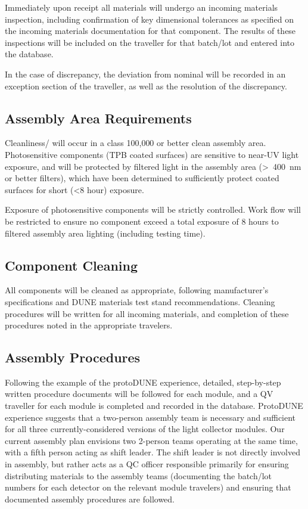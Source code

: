 Immediately upon receipt all materials will undergo an incoming materials inspection, including confirmation of key dimensional tolerances as specified on the incoming materials documentation for that component.  The results of these inspections will be included on the traveller for that batch/lot and entered into the database.

In the case of discrepancy, the deviation from nominal will be recorded in an exception section of the traveller, as well as the resolution of the discrepancy.

\subsection{Assembly Area Requirements}

Cleanliness/ will occur in a class 100,000 or better clean assembly area.  Photosensitive components (TPB coated surfaces) are sensitive to near-UV light exposure, and will be protected by filtered light in the assembly area (>~400~nm or better filters), which have been determined to sufficiently protect coated surfaces for short (<8 hour) exposure.

Exposure of photosensitive components will be strictly controlled.  Work flow will be restricted to ensure no component exceed a total exposure of 8 hours to filtered assembly area lighting (including testing time).

\subsection{Component Cleaning}

All components will be cleaned  as appropriate, following manufacturer's specifications and DUNE materials test stand recommendations.  Cleaning procedures will be written for all incoming materials, and completion of these procedures noted in the appropriate travelers.

\subsection{Assembly Procedures}

Following the example of the protoDUNE experience, detailed, step-by-step written procedure documents will be followed for each module, and a QV traveller for each module is completed and recorded in the database.  ProtoDUNE experience suggests that a two-person assembly team is necessary and sufficient for all three currently-considered versions of the light collector modules.  Our current assembly plan envisions two 2-person teams operating at the same time, with a fifth person acting as shift leader.  The shift leader is not directly involved in assembly, but rather acts as a QC officer responsible primarily for ensuring distributing materials to the assembly teams (documenting the batch/lot numbers for each detector on the relevant module travelers) and ensuring that documented assembly procedures are followed.

